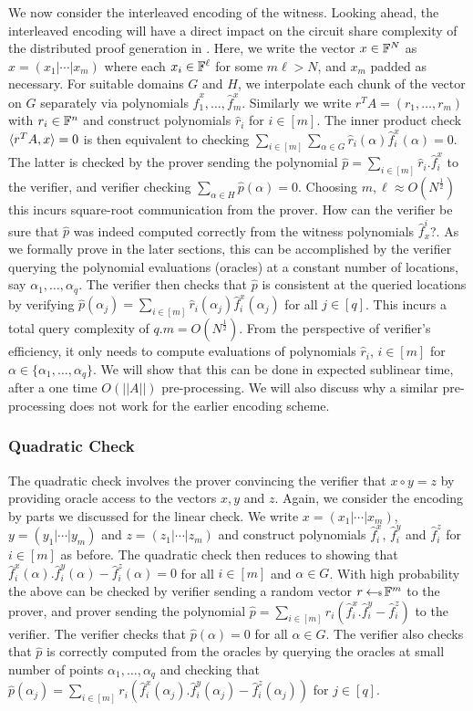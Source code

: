 We now consider the interleaved encoding of the witness. 
Looking ahead, the interleaved encoding will have a direct impact on the circuit share complexity 
of the distributed proof generation in \name{}.
Here, we write the vector $x\in \mathbb{F}^N$ as $x=(x_1|\cdots|x_m)$
where each $x_i\in \mathbb{F}^\ell$ for some $m\ell > N$, and $x_m$ padded as necessary. For
suitable domains $G$ and $H$, we interpolate each chunk of the vector on $G$ 
separately via 
polynomials $\hat{f}^x_1,\ldots,\hat{f}^x_m$. Similarly we write
$r^TA=(r_1,\ldots,r_m)$ with $r_i\in \mathbb{F}^n$ and construct polynomials $\hat{r}_i$
for $i\in [m]$. The inner product check $\langle r^TA,x\rangle=0$ is then equivalent to checking
$\sum_{i\in [m]}\sum_{\alpha\in G}\hat{r}_i(\alpha)\hat{f}^x_i(\alpha)=0$. The
latter is checked by the prover sending the polynomial $\hat{p}=\sum_{i\in
[m]}\hat{r}_i.\hat{f}^x_i$ to the verifier, and verifier checking
$\sum_{\alpha\in H}\hat{p}(\alpha)=0$. Choosing $m,\ell\approx O(N^\frac{1}{2})$ this
incurs square-root communication from the prover. How can the verifier be
sure that $\hat{p}$ was indeed computed correctly from the witness polynomials 
$\hat{f}^i_x$?. As we formally prove in the later sections, this can be
accomplished by the verifier querying the polynomial evaluations (oracles) at a constant
number of locations, say $\alpha_1,\ldots,\alpha_q$. The verifier then checks
that $\hat{p}$ is consistent at the queried locations by verifying
$\hat{p}(\alpha_j)=\sum_{i\in [m]}\hat{r}_i(\alpha_j)\hat{f}^x_i(\alpha_j)$ for
all $j\in [q]$. This incurs a total query complexity of $q.m=O(N^\frac{1}{2})$.
From the perspective of 
verifier's efficiency, it only needs to compute evaluations of
polynomials 
$\hat{r}_i$, $i\in [m]$ for $\alpha\in \{\alpha_1,\ldots,\alpha_q\}$. We will show
that this can be done in expected sublinear time, after a one time $O(||
A||)$ 
pre-processing. We will also discuss why a similar pre-processing does not work
for the earlier encoding scheme.

\subsubsection{Quadratic Check}
The quadratic check involves the prover convincing the verifier that $x\circ
y=z$ by providing oracle access to the vectors $x,y$ and $z$. Again, we
consider the encoding by parts we discussed for the linear check. We write
$x=(x_1|\cdots|x_m)$, $y=(y_1|\cdots|y_m)$ and $z=(z_1|\cdots|z_m)$ and
construct polynomials $\hat{f}^x_i$, $\hat{f}^y_i$ and $\hat{f}^z_i$ for $i\in
[m]$ as before. The quadratic check then reduces to showing that
$\hat{f}^x_i(\alpha).\hat{f}^y_i(\alpha)-\hat{f}^z_i(\alpha)=0$ for all $i\in
[m]$ and $\alpha\in G$. With high probability the above can be checked by
verifier sending a random vector $r\hskip2.3pt{\gets\!\!\mbox{\tiny${\$}$\normalsize}}\, \mathbb{F}^m$ to the prover, and prover
sending the polynomial $\hat{p}=\sum_{i\in
[m]}r_i(\hat{f}^x_i.\hat{f}^y_i-\hat{f}^z_i)$ to the verifier. The verifier
checks that $\hat{p}(\alpha)=0$ for all $\alpha\in G$. The verifier also checks
that $\hat{p}$ is correctly computed from the oracles by querying the oracles
at small number of points $\alpha_1,\ldots,\alpha_q$ and checking that
$\hat{p}(\alpha_j)=\sum_{i\in
[m]}r_i(\hat{f}^x_i(\alpha_j).\hat{f}^y_i(\alpha_j)-\hat{f}^z_i(\alpha_j))$ for
$j\in [q]$.

